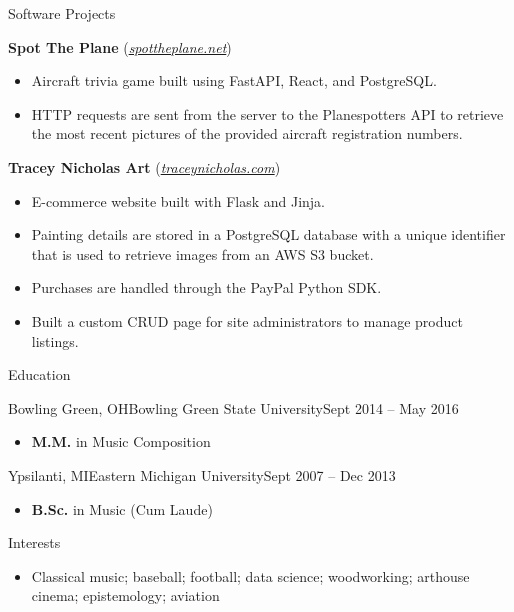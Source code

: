 \documentclass[calibri]{mcdowellcv}
\begin{document}
	\begin{cvsection}{Software Projects}
		\begin{cvsubsection}{}{}{}
			\textbf{Spot The Plane} (\textit{{\color{blue}\href{https://www.spottheplane.net/}{spottheplane.net}}})
			\begin{itemize}
				\item Aircraft trivia game built using FastAPI, React, and PostgreSQL.
				\item HTTP requests are sent from the server to the Planespotters API to retrieve the most recent pictures of the provided aircraft registration numbers.
			\end{itemize}
		\end{cvsubsection}

		\begin{cvsubsection}{}{}{}
			\textbf{Tracey Nicholas Art} (\textit{{\color{blue}\href{https://www.traceynicholas.com/}{traceynicholas.com}}})
			\begin{itemize}
				\item E-commerce website built with Flask and Jinja.
				\item Painting details are stored in a PostgreSQL database with a unique identifier that is used to retrieve images from an AWS S3 bucket.
				\item Purchases are handled through the PayPal Python SDK.
				\item Built a custom CRUD page for site administrators to manage product listings.
			\end{itemize}
		\end{cvsubsection}
	\end{cvsection}
	
	\begin{cvsection}{Education}
		\begin{cvsubsection}{Bowling Green, OH}{Bowling Green State University}{Sept 2014 -- May 2016}
			\begin{itemize}
				\item \textbf{M.M.} in Music Composition
			\end{itemize}
		\end{cvsubsection}
		\begin{cvsubsection}{Ypsilanti, MI}{Eastern Michigan University}{Sept 2007 -- Dec 2013}
			\begin{itemize}
				\item \textbf{B.Sc.} in Music (Cum Laude)
			\end{itemize}
		\end{cvsubsection}
	\end{cvsection}

	\begin{cvsection}{Interests}
		\begin{cvsubsection}{}{}{}
			\begin{itemize}
				\item Classical music; baseball; football; data science; woodworking; arthouse cinema; epistemology; aviation
			\end{itemize}
		\end{cvsubsection}
	\end{cvsection}
\end{document}
